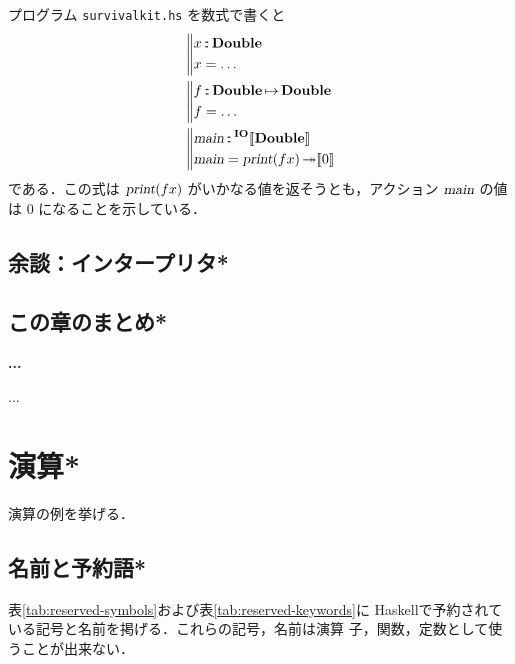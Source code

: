 \documentclass[a5paper,twoside,fleqn,draft]{jsbook}
\def\[{[\![}
\def\]{]\!]}
\newcommand{\programminglanguage}[1]{\textsf{#1}}
\newcommand{\haskell}{\programminglanguage{Haskell}}
\newenvironment{leader}{\begingroup\gt}{\endgroup}
\newenvironment{note}[1]{\begin{boxnote}\begin{center}\textbf{#1}\end{center}}{\end{boxnote}}
\newcommand{\filename}[1]{\texttt{#1}}
\newcommand{\mBrace}{\Vert}
\newcommand{\mAction}[1]{\textsl{#1}}
\DeclareMathOperator{\mMain}{\mAction{main}}
\DeclareMathOperator{\mPrint}{\mAction{print}}
\DeclareMathOperator{\mBindRightIgnore}{\twoheadrightarrow}
\DeclareMathOperator{\mIn}{{:\!:}}
\DeclareMathOperator{\mMapsTo}{\mapsto}
\newcommand{\mType}[1]{\mathbf{#1}} %
\newcommand{\mDoubleType}{\mType{Double}}
\newcommand{\mTypeAssemble}[2]{{}^\mType{#1}\[\mType{#2}\]}
\newcommand{\mIOType}[1]{\mTypeAssemble{IO}{#1}}
\newcommand{\mIODoubleType}{\mIOType{\mDoubleType}}
\newcommand{\mPureWith}[1]{\[#1\]}
\newcommand{\mProjEXP}[2]{#1\mMapsTo#2} %
\begin{document}
プログラム \filename{survivalkit.hs} を数式で書くと
\begin{align}
  {}&\left\mBrace
    \begin{aligned}
      x&\mIn\mDoubleType\\
      x&=\dots\\
    \end{aligned}
    \right.\\
  {}&\left\mBrace
    \begin{aligned}
      f&\mIn{}\mProjEXP{\mDoubleType}{\mDoubleType}\\
      f&=\dots\\
    \end{aligned}
    \right.\\
  {}&\left\mBrace
    \begin{aligned}
      \mMain&\mIn{}\mIODoubleType\\
      \mMain&=\mPrint(fx)\mBindRightIgnore\mPureWith{0}
    \end{aligned}
    \right.
\end{align}
である．この式は $\mPrint(fx)$ がいかなる値を返そうとも，アクション
$\mMain$ の値は $0$ になることを示している．

\section{余談：インタープリタ*}

\section{この章のまとめ*}

\begin{note}{...}
...
\end{note}

\chapter{演算*}
\label{ch:arithmetic}

\begin{leader}
演算の例を挙げる．
\end{leader}


\section{名前と予約語*}

表\ref{tab:reserved-symbols}および表\ref{tab:reserved-keywords}に
\haskell で予約されている記号と名前を掲げる．これらの記号，名前は演算
子，関数，定数として使うことが出来ない．
\end{document}
